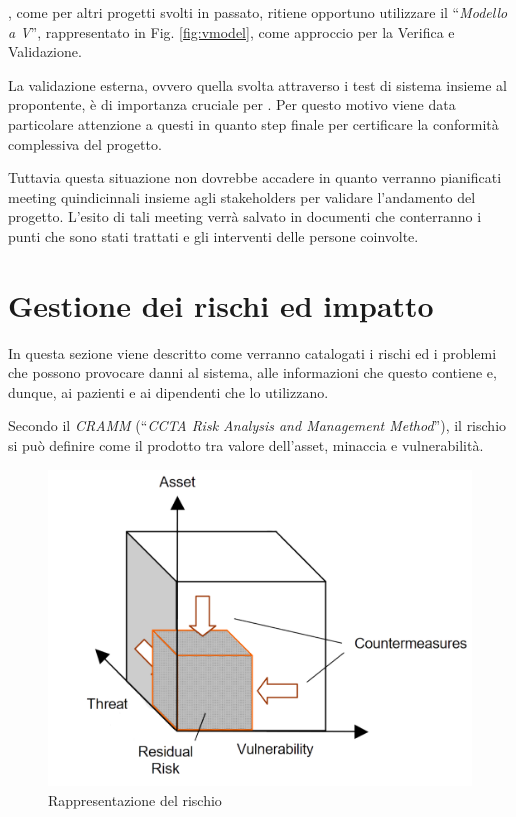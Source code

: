 	\azienda, come per altri progetti svolti in passato, ritiene opportuno utilizzare il ``\textit{Modello a V}'', rappresentato in Fig. \ref{fig:vmodel}, come approccio per la Verifica e Validazione.
	
	La validazione esterna, ovvero quella svolta attraverso i test di sistema insieme al propontente, è di importanza cruciale per \azienda.
	Per questo motivo viene data particolare attenzione a questi in quanto step finale per certificare la conformità complessiva del progetto.
	
	Tuttavia questa situazione non dovrebbe accadere in quanto verranno pianificati meeting quindicinnali insieme agli stakeholders per validare l'andamento del progetto.
	L'esito di tali meeting verrà salvato in documenti che conterranno i punti che sono stati trattati e gli interventi delle persone coinvolte.

\newpage
\section{Gestione dei rischi ed impatto}\label{sec:rischi}

	In questa sezione viene descritto come verranno catalogati i rischi ed i problemi che possono provocare danni al sistema, alle informazioni che questo contiene e, dunque, ai pazienti e ai dipendenti che lo utilizzano.
	
	Secondo il \textit{CRAMM} (``\textit{CCTA Risk Analysis and Management Method}''), il rischio si può definire come il prodotto tra valore dell'asset, minaccia e vulnerabilità.
	
	\begin{figure}[h!]
		\centering
		\includegraphics[width=\linewidth-2cm]{img/risk.png}
		\caption{Rappresentazione del rischio\cite{risk}}
		\label{fig:risk}
	\end{figure}

